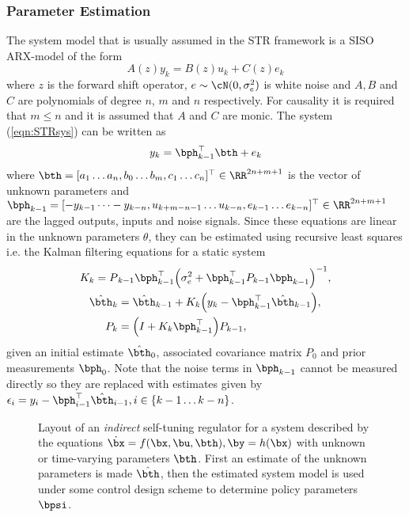 \subsubsection{Parameter Estimation}
The system model that is usually assumed in the STR framework is a SISO ARX-model of the form
\begin{equation}
A(z) y_k = B(z) u_k + C(z) e_k 
\label{eqn:STRsys}
\end{equation}
where $z$ is the forward shift operator, $e \sim \cN(0,\sigma_e^2)$ is white noise and $A, B$ and $C$ are polynomials of degree $n$, $m$ and $n$ respectively. For causality it is required that $m \leq n$ and it is assumed that $A$ and $C$ are monic. The system (\ref{eqn:STRsys}) can be written as
\begin{equation}
y_k = \bph^\top_{k-1} \bth + e_k
\end{equation}
where $\bth = [a_1 \dots a_n,b_0 \dots b_m, c_1 \dots c_n]^\top \in \RR^{2n+m+1}$ is the vector of unknown parameters and $\bph_{k-1} = [-y_{k-1} \dots -y_{k-n}, u_{k+m-n-1} \dots u_{k-n}, e_{k-1} \dots e_{k-n}]^\top \in \RR^{2n+m+1}$ are the lagged outputs, inputs and noise signals. Since these equations are linear in the unknown parameters $\theta$, they can be estimated using recursive least squares i.e. the Kalman filtering equations for a static system
\begin{align}
K_k = P&_{k-1}\bph^\top_{k-1}\Big( \sigma_e^2 + \bph^\top_{k-1} P_{k-1} \bph_{k-1}\Big)^{-1}, \\
\hat\bth_k &= \hat\bth_{k-1} + K_k \Big( y_k - \bph^\top_{k-1} \hat\bth_{k-1} \Big), \\
P_k &= \Big(I + K_k\bph^\top_{k-1}\Big)P_{k-1},
\end{align}
given an initial estimate $\hat\bth_0$, associated covariance matrix $P_0$ and prior measurements $\bph_0$. Note that the noise terms in $\bph_{k-1}$ cannot be measured directly so they are replaced with estimates given by $\epsilon_i = y_i - \bph^\top_{i-1} \hat\bth_{i-1}, i \in \{k-1 \dots k-n\}$.


\begin{figure}
\centering

\caption{Layout of an \textit{indirect} self-tuning regulator for a system described by the equations $\dot\bx = f(\bx,\bu,\bth), \by = h(\bx)$ with unknown or time-varying parameters $\bth$. First an estimate of the unknown parameters is made $\hat\bth$, then the estimated system model is used under some control design scheme to determine policy parameters $\bpsi$.}
\label{figs:STRfig}
\end{figure}

